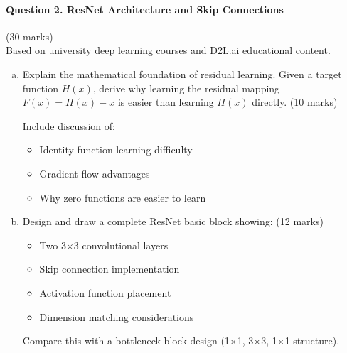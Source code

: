 \documentclass[12pt]{article}
\newcommand{\shortanswer}{\vspace{2cm}}
\newcommand{\mediumanswer}{\vspace{3cm}}
\begin{document}
\newpage
\paragraph{Question 2. ResNet Architecture and Skip Connections}\hfill (30 marks)\\
Based on university deep learning courses and D2L.ai educational content.

\begin{enumerate}[(a)]
    \item Explain the mathematical foundation of residual learning. Given a target function $H(x)$, derive why learning the residual mapping $F(x) = H(x) - x$ is easier than learning $H(x)$ directly. \hfill (10 marks)
    
    Include discussion of:
    \begin{itemize}
        \item Identity function learning difficulty
        \item Gradient flow advantages
        \item Why zero functions are easier to learn
    \end{itemize}
    
    \mediumanswer
    
    \item Design and draw a complete ResNet basic block showing: \hfill (12 marks)
    \begin{itemize}
        \item Two 3×3 convolutional layers
        \item Skip connection implementation
        \item Activation function placement
        \item Dimension matching considerations
    \end{itemize}
    
    Compare this with a bottleneck block design (1×1, 3×3, 1×1 structure).
    
    \begin{center}
    \end{center}
    
    \shortanswer
    

\end{enumerate}
\end{document}
